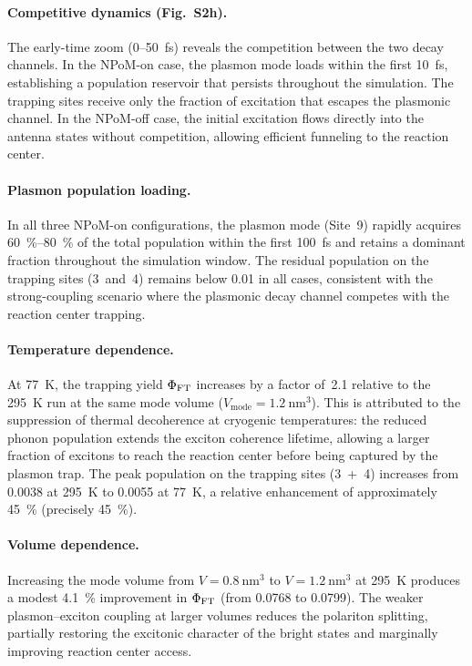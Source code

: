 \documentclass[11pt,a4paper]{article}
\begin{document}
\paragraph{Competitive dynamics (Fig.~S2h).}
The early-time zoom (0--\qty{50}{\fs}) reveals the competition between the two
decay channels. In the NPoM-on case, the plasmon mode loads within
the first \qty{10}{\fs}, establishing a population reservoir that
persists throughout the simulation. The trapping sites receive only the
fraction of excitation that escapes the plasmonic channel. In the NPoM-off
case, the initial excitation flows directly into the antenna states without
competition, allowing efficient funneling to the reaction center.

\paragraph{Plasmon population loading.}
In all three NPoM-on configurations, the plasmon mode (Site~9) rapidly acquires
\qty{60}{\percent}--\qty{80}{\percent} of the total population within the first
\qty{100}{\fs} and retains a dominant fraction throughout the simulation window.
The residual population on the trapping sites (3~and~4) remains below
\num{0.01} in all cases, consistent with the strong-coupling scenario where
the plasmonic decay channel competes with the reaction center trapping.

\paragraph{Temperature dependence.} \label{SI-sec:cryo}
At \qty{77}{\kelvin}, the trapping yield $\Phi_{\rm FT}$ increases by a factor of~2.1 relative to the \qty{295}{\kelvin} run at the same mode volume
($V_{\mathrm{mode}} = \qty{1.2}{\nm\cubed}$). This is attributed to the suppression of thermal
decoherence at cryogenic temperatures: the reduced phonon population extends
the exciton coherence lifetime, allowing a larger fraction of excitons to reach
the reaction center before being captured by the plasmon trap.
The peak population on the trapping sites (3~+~4) increases from \num{0.0038}
at \qty{295}{\kelvin} to \num{0.0055} at \qty{77}{\kelvin}, a relative enhancement
of approximately \qty{45}{\percent} (precisely \qty{45}{\percent}).

\paragraph{Volume dependence.}
Increasing the mode volume from $V = \qty{0.8}{\nm\cubed}$ to
$V = \qty{1.2}{\nm\cubed}$ at \qty{295}{\kelvin} produces a modest
\qty{4.1}{\percent} improvement in $\Phi_{\rm FT}$ (from \num{0.0768} to
\num{0.0799}). The weaker plasmon--exciton coupling at larger volumes reduces
the polariton splitting, partially restoring the excitonic character of the
bright states and marginally improving reaction center access.
\end{document}
